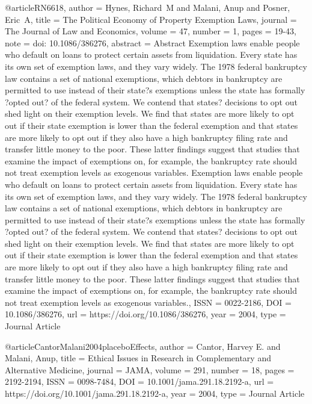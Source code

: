 {@article{RN6618,
   author = {Hynes, Richard M and Malani, Anup and Posner, Eric A},
   title = {The Political Economy of Property Exemption Laws},
   journal = {The Journal of Law and Economics},
   volume = {47},
   number = {1},
   pages = {19-43},
   note = {doi: 10.1086/386276},
   abstract = {Abstract Exemption laws enable people who default on loans to protect certain assets from liquidation. Every state has its own set of exemption laws, and they vary widely. The 1978 federal bankruptcy law contains a set of national exemptions, which debtors in bankruptcy are permitted to use instead of their state?s exemptions unless the state has formally ?opted out? of the federal system. We contend that states? decisions to opt out shed light on their exemption levels. We find that states are more likely to opt out if their state exemption is lower than the federal exemption and that states are more likely to opt out if they also have a high bankruptcy filing rate and transfer little money to the poor. These latter findings suggest that studies that examine the impact of exemptions on, for example, the bankruptcy rate should not treat exemption levels as exogenous variables.
Exemption laws enable people who default on loans to protect certain assets from liquidation. Every state has its own set of exemption laws, and they vary widely. The 1978 federal bankruptcy law contains a set of national exemptions, which debtors in bankruptcy are permitted to use instead of their state?s exemptions unless the state has formally ?opted out? of the federal system. We contend that states? decisions to opt out shed light on their exemption levels. We find that states are more likely to opt out if their state exemption is lower than the federal exemption and that states are more likely to opt out if they also have a high bankruptcy filing rate and transfer little money to the poor. These latter findings suggest that studies that examine the impact of exemptions on, for example, the bankruptcy rate should not treat exemption levels as exogenous variables.},
   ISSN = {0022-2186},
   DOI = {10.1086/386276},
   url = {https://doi.org/10.1086/386276},
   year = {2004},
   type = {Journal Article}
}


@article{CantorMalani2004placeboEffects,
   author = {Cantor, Harvey E. and Malani, Anup},
   title = {Ethical Issues in Research in Complementary and Alternative Medicine},
   journal = {JAMA},
   volume = {291},
   number = {18},
   pages = {2192-2194},
   ISSN = {0098-7484},
   DOI = {10.1001/jama.291.18.2192-a},
   url = {https://doi.org/10.1001/jama.291.18.2192-a},
   year = {2004},
   type = {Journal Article}
}

}
